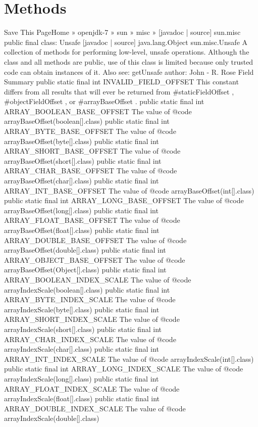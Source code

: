 
\section{Methods} \label{sec:methods}

 Save This PageHome » openjdk-7 » sun » misc » [javadoc | source]
sun.misc
public final class: Unsafe [javadoc | source] 
java.lang.Object
   sun.misc.Unsafe
A collection of methods for performing low-level, unsafe operations. Although the class and all methods are public, use of this class is limited because only trusted code can obtain instances of it.
Also see:
getUnsafe
author: John - R. Rose
Field Summary
public static final  int	INVALID_FIELD_OFFSET   	This constant differs from all results that will ever be returned from #staticFieldOffset , #objectFieldOffset , or #arrayBaseOffset . 
public static final  int	ARRAY_BOOLEAN_BASE_OFFSET   	The value of {@code arrayBaseOffset(boolean[].class)} 
public static final  int	ARRAY_BYTE_BASE_OFFSET   	The value of {@code arrayBaseOffset(byte[].class)} 
public static final  int	ARRAY_SHORT_BASE_OFFSET   	The value of {@code arrayBaseOffset(short[].class)} 
public static final  int	ARRAY_CHAR_BASE_OFFSET   	The value of {@code arrayBaseOffset(char[].class)} 
public static final  int	ARRAY_INT_BASE_OFFSET   	The value of {@code arrayBaseOffset(int[].class)} 
public static final  int	ARRAY_LONG_BASE_OFFSET   	The value of {@code arrayBaseOffset(long[].class)} 
public static final  int	ARRAY_FLOAT_BASE_OFFSET   	The value of {@code arrayBaseOffset(float[].class)} 
public static final  int	ARRAY_DOUBLE_BASE_OFFSET   	The value of {@code arrayBaseOffset(double[].class)} 
public static final  int	ARRAY_OBJECT_BASE_OFFSET   	The value of {@code arrayBaseOffset(Object[].class)} 
public static final  int	ARRAY_BOOLEAN_INDEX_SCALE   	The value of {@code arrayIndexScale(boolean[].class)} 
public static final  int	ARRAY_BYTE_INDEX_SCALE   	The value of {@code arrayIndexScale(byte[].class)} 
public static final  int	ARRAY_SHORT_INDEX_SCALE   	The value of {@code arrayIndexScale(short[].class)} 
public static final  int	ARRAY_CHAR_INDEX_SCALE   	The value of {@code arrayIndexScale(char[].class)} 
public static final  int	ARRAY_INT_INDEX_SCALE   	The value of {@code arrayIndexScale(int[].class)} 
public static final  int	ARRAY_LONG_INDEX_SCALE   	The value of {@code arrayIndexScale(long[].class)} 
public static final  int	ARRAY_FLOAT_INDEX_SCALE   	The value of {@code arrayIndexScale(float[].class)} 
public static final  int	ARRAY_DOUBLE_INDEX_SCALE   	The value of {@code arrayIndexScale(double[].class)} 
